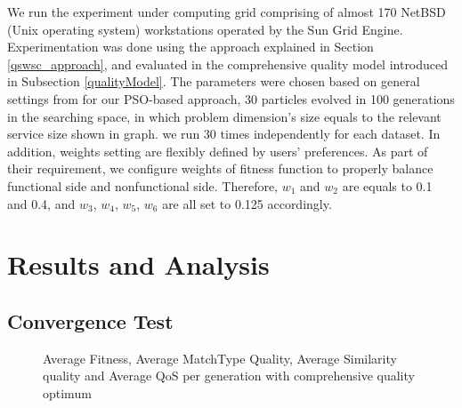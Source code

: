 \documentclass{llncs}
\begin{document}
We run the experiment under computing grid comprising of almost 170 NetBSD (Unix operating system) workstations operated by the Sun Grid Engine. Experimentation was done using the approach explained in Section \ref{qswsc_approach}, and evaluated in the comprehensive quality model introduced in Subsection \ref{qualityModel}. The parameters were chosen based on general settings from \cite{shi2001particle} for our PSO-based approach, 30 particles evolved in 100 generations in the searching space, in which problem dimension's size equals to the relevant service size shown in graph. we run 30 times independently for each dataset. In addition, weights setting are flexibly defined by users' preferences. As part of their requirement, we configure weights of fitness function to properly balance functional side and nonfunctional side. Therefore, $w_{1}$ and $w_{2}$ are equals to 0.1 and 0.4,  and $w_{3}$, $w_{4}$, $w_{5}$, $w_{6}$ are all set to 0.125 accordingly.

\section{Results and Analysis}\label{results_analysis}
\subsection{Convergence Test}\label{convergenceTest}

\begin{figure}[h]
\centerline{
}
 \caption{Average Fitness, Average MatchType Quality, Average Similarity quality and Average QoS per generation with comprehensive quality optimum}
 \label{exp_fitnessvalue}
\end{figure}
\end{document}
